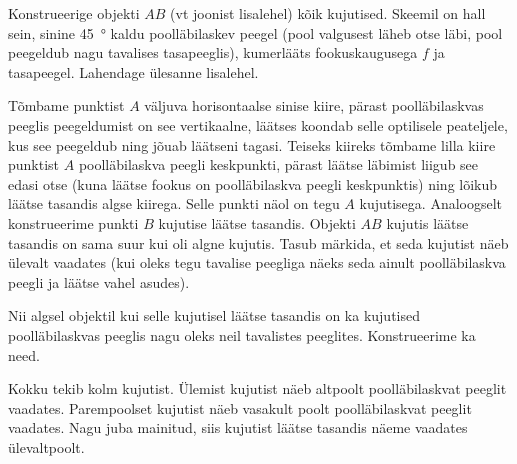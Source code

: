 
Konstrueerige objekti $AB$ (vt joonist lisalehel) kõik kujutised. Skeemil on hall sein, sinine \SI{45}{\degree} kaldu poolläbilaskev peegel (pool valgusest läheb otse läbi, pool peegeldub nagu tavalises tasapeeglis), kumerlääts fookuskaugusega $f$ ja tasapeegel. Lahendage ülesanne lisalehel.


\hint

\solu
\par
Tõmbame punktist $A$ väljuva horisontaalse sinise kiire, pärast poolläbilaskvas peeglis peegeldumist on see vertikaalne, läätses koondab selle optilisele peateljele, kus see peegeldub ning jõuab läätseni tagasi. Teiseks kiireks tõmbame lilla kiire punktist $A$ poolläbilaskva peegli keskpunkti, pärast läätse läbimist liigub see edasi otse (kuna läätse fookus on poolläbilaskva peegli keskpunktis) ning lõikub läätse tasandis algse kiirega. Selle punkti näol on tegu $A$ kujutisega. Analoogselt konstrueerime punkti $B$ kujutise läätse tasandis. Objekti $AB$ kujutis läätse tasandis on sama suur kui oli algne kujutis. Tasub märkida, et seda kujutist näeb ülevalt vaadates (kui oleks tegu tavalise peegliga näeks seda ainult poolläbilaskva peegli ja läätse vahel asudes).

Nii algsel objektil kui selle kujutisel läätse tasandis on ka kujutised poolläbilaskvas peeglis nagu oleks neil tavalistes peeglites. Konstrueerime ka need.

Kokku tekib kolm kujutist. Ülemist kujutist näeb altpoolt poolläbilaskvat peeglit vaadates. Parempoolset kujutist näeb vasakult poolt poolläbilaskvat peeglit vaadates. Nagu juba mainitud, siis kujutist läätse tasandis näeme vaadates ülevaltpoolt.

